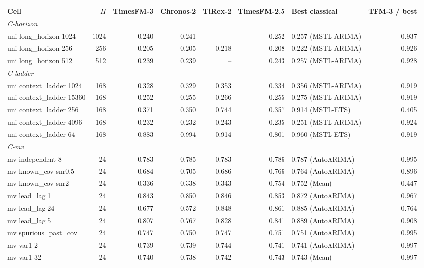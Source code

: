 \begin{tabular}{lrrrrrlr}
\toprule
Cell & $H$ & TimesFM-3 & Chronos-2 & TiRex-2 & TimesFM-2.5 & Best classical & TFM-3 / best \\
\midrule
\multicolumn{8}{l}{\textit{C-horizon}} \\
uni long\_horizon 1024 & 1024 & 0.240 & 0.241 & -- & 0.252 & 0.257 (MSTL-ARIMA) & 0.937 \\
uni long\_horizon 256 & 256 & 0.205 & 0.205 & 0.218 & 0.208 & 0.222 (MSTL-ARIMA) & 0.926 \\
uni long\_horizon 512 & 512 & 0.239 & 0.239 & -- & 0.243 & 0.257 (MSTL-ARIMA) & 0.928 \\
\midrule
\multicolumn{8}{l}{\textit{C-ladder}} \\
uni context\_ladder 1024 & 168 & 0.328 & 0.329 & 0.353 & 0.334 & 0.356 (MSTL-ARIMA) & 0.919 \\
uni context\_ladder 15360 & 168 & 0.252 & 0.255 & 0.266 & 0.255 & 0.275 (MSTL-ARIMA) & 0.919 \\
uni context\_ladder 256 & 168 & 0.371 & 0.350 & 0.744 & 0.357 & 0.914 (MSTL-ETS) & 0.405 \\
uni context\_ladder 4096 & 168 & 0.232 & 0.232 & 0.243 & 0.235 & 0.251 (MSTL-ARIMA) & 0.924 \\
uni context\_ladder 64 & 168 & 0.883 & 0.994 & 0.914 & 0.801 & 0.960 (MSTL-ETS) & 0.919 \\
\midrule
\multicolumn{8}{l}{\textit{C-mv}} \\
mv independent 8 & 24 & 0.783 & 0.785 & 0.783 & 0.786 & 0.787 (AutoARIMA) & 0.995 \\
mv known\_cov snr0.5 & 24 & 0.684 & 0.705 & 0.686 & 0.766 & 0.764 (AutoARIMA) & 0.896 \\
mv known\_cov snr2 & 24 & 0.336 & 0.338 & 0.343 & 0.754 & 0.752 (Mean) & 0.447 \\
mv lead\_lag 1 & 24 & 0.843 & 0.850 & 0.846 & 0.853 & 0.872 (AutoARIMA) & 0.967 \\
mv lead\_lag 24 & 24 & 0.677 & 0.572 & 0.848 & 0.861 & 0.885 (AutoARIMA) & 0.764 \\
mv lead\_lag 5 & 24 & 0.807 & 0.767 & 0.828 & 0.841 & 0.889 (AutoARIMA) & 0.908 \\
mv spurious\_past\_cov & 24 & 0.747 & 0.750 & 0.747 & 0.751 & 0.751 (AutoARIMA) & 0.995 \\
mv var1 2 & 24 & 0.739 & 0.739 & 0.744 & 0.741 & 0.741 (AutoARIMA) & 0.997 \\
mv var1 32 & 24 & 0.740 & 0.738 & 0.742 & 0.743 & 0.743 (Mean) & 0.997 \\

\end{tabular}
